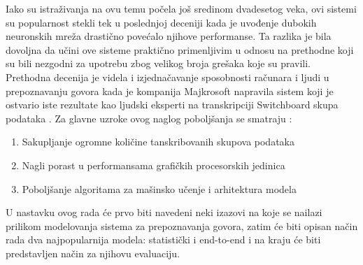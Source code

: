 \documentclass[a4paper]{article}
\begin{document}
Iako su istraživanja na ovu temu počela još sredinom dvadesetog veka, ovi sistemi su popularnost stekli tek u poslednjoj deceniji kada je uvođenje dubokih neuronskih mreža drastično povećalo njihove performanse.
Ta razlika je bila dovoljna da učini ove sisteme praktično primenljivim u odnosu na prethodne koji su bili nezgodni za upotrebu zbog velikog broja grešaka koje su pravili.
Prethodna decenija je videla i izjednačavanje sposobnosti računara i ljudi u prepoznavanju govora kada je kompanija Majkrosoft napravila sistem koji je ostvario iste rezultate kao ljudski eksperti na transkripciji Switchboard skupa podataka \cite{switchboard}.
Za glavne uzroke ovog naglog poboljšanja se smatraju \cite{hannun2021history}:
\begin{enumerate}
  \item Sakupljanje ogromne količine tanskribovanih skupova podataka
  \item Nagli porast u performansama grafičkih procesorskih jedinica
  \item Poboljšanje algoritama za mašinsko učenje i arhitektura modela
\end{enumerate}

U nastavku ovog rada će prvo biti navedeni neki izazovi na koje se nailazi prilikom modelovanja sistema za prepoznavanja govora, zatim će biti opisan način rada dva najpopularnija modela: statistički i end-to-end i na kraju će biti predstavljen način za njihovu evaluaciju.
\end{document}
